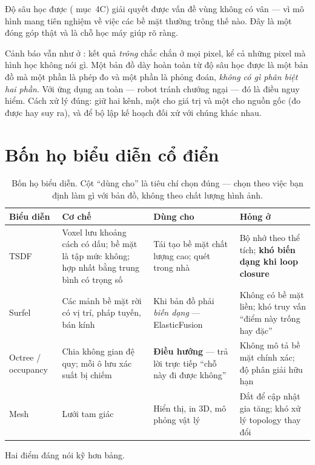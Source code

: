 \documentclass[../../vslam.tex]{subfiles}
\begin{document}
Độ sâu học được ( mục~4C) giải quyết được vấn đề vùng không có vân --- vì mô hình mang tiên nghiệm về việc các bề mặt thường trông thế nào. Đây là một đóng góp thật và là chỗ học máy giúp rõ ràng.

Cảnh báo vẫn như ở : kết quả \emph{trông} chắc chắn ở mọi pixel, kể cả những pixel mà hình học không nói gì. Một bản đồ dày hoàn toàn từ độ sâu học được là một bản đồ mà một phần là phép đo và một phần là phỏng đoán, \emph{không có gì phân biệt hai phần}. Với ứng dụng an toàn --- robot tránh chướng ngại --- đó là điều nguy hiểm. Cách xử lý đúng: giữ hai kênh, một cho giá trị và một cho nguồn gốc (đo được hay suy ra), và để bộ lập kế hoạch đối xử với chúng khác nhau.

\section{Bốn họ biểu diễn cổ điển}

\begin{table}[H]\centering\small
\caption{Bốn họ biểu diễn. Cột ``dùng cho'' là tiêu chí chọn đúng --- chọn theo việc bạn định làm gì với bản đồ, không theo chất lượng hình ảnh.}
\label{tab:c16-repr}
\begin{tabularx}{\linewidth}{@{}L{1.9cm}L{3.0cm}L{3.1cm}Y@{}}
\toprule
\textbf{Biểu diễn} & \textbf{Cơ chế} & \textbf{Dùng cho} & \textbf{Hỏng ở}\\
\midrule
TSDF & Voxel lưu khoảng cách có dấu; bề mặt là tập mức không; hợp nhất bằng trung bình có trọng số & Tái tạo bề mặt chất lượng cao; quét trong nhà & Bộ nhớ theo thể tích; \textbf{khó biến dạng khi loop closure}\\
Surfel & Các mảnh bề mặt rời có vị trí, pháp tuyến, bán kính & Khi bản đồ phải \emph{biến dạng} --- ElasticFusion & Không có bề mặt liền; khó truy vấn ``điểm này trống hay đặc''\\
Octree / occupancy & Chia không gian đệ quy; mỗi ô lưu xác suất bị chiếm & \textbf{Điều hướng} --- trả lời trực tiếp ``chỗ này đi được không'' & Không mô tả bề mặt chính xác; độ phân giải hữu hạn\\
Mesh & Lưới tam giác & Hiển thị, in \(3\)D, mô phỏng vật lý & Đắt để cập nhật gia tăng; khó xử lý topology thay đổi\\
\bottomrule
\end{tabularx}
\end{table}

Hai điểm đáng nói kỹ hơn bảng.
\end{document}
